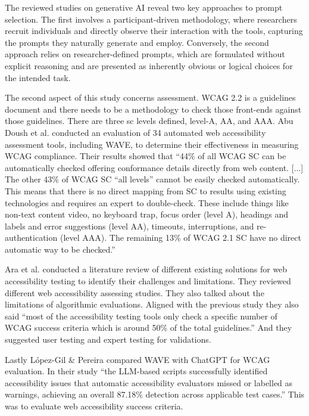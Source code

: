 \documentclass{article}
\begin{document}
The reviewed studies on generative AI reveal two key approaches to prompt selection.
The first involves a participant-driven methodology, where researchers recruit individuals and directly observe their interaction with the tools,
capturing the prompts they naturally generate and employ.
Conversely, the second approach relies on researcher-defined prompts,
which are formulated without explicit reasoning and are presented as inherently obvious or logical choices for the intended task.

The second aspect of this study concerns assessment.
WCAG 2.2 is a guidelines document and there needs to be a methodology to check those front-ends against those guidelines.
There are three \ac{sc} levels defined, level-A, AA, and AAA.
Abu Doush et al. \cite{abu_doush_web_2023} conducted an evaluation of 34 automated web accessibility assessment tools, including WAVE,
to determine their effectiveness in measuring WCAG compliance.
Their results showed that “44\% of all WCAG SC can be automatically checked offering conformance details directly from web content.
[...] The other 43\% of WCAG SC “all levels” cannot be easily checked automatically.
This means that there is no direct mapping from SC to results using existing technologies and requires an expert to double-check.
These include things like non-text content video, no keyboard trap, focus order (level A), headings and labels
and error suggestions (level AA), timeouts, interruptions, and re-authentication (level AAA).
The remaining 13\% of WCAG 2.1 SC have no direct automatic way to be checked.” \cite{abu_doush_web_2023}

Ara et al. \cite{ara_inclusive_2024} conducted a literature review of different existing solutions for web accessibility
testing to identify their challenges and limitations.
They reviewed different web accessibility assessing studies.
They also talked about the limitations of algorithmic evaluations.
Aligned with the previous study they also said
“most of the accessibility testing tools only check a specific number of WCAG success criteria which is around 50\% of the total guidelines.”
And they suggested user testing and expert testing for validations. \cite{ara_inclusive_2024}

Lastly López-Gil \& Pereira \cite{lopez-gil_turning_2025} compared WAVE with ChatGPT for WCAG evaluation.
In their study “the LLM-based scripts successfully identified accessibility issues that automatic accessibility evaluators missed or labelled as warnings,
achieving an overall 87.18\% detection across applicable test cases.” This was to evaluate web accessibility success criteria. \cite{lopez-gil_turning_2025}
\end{document}

